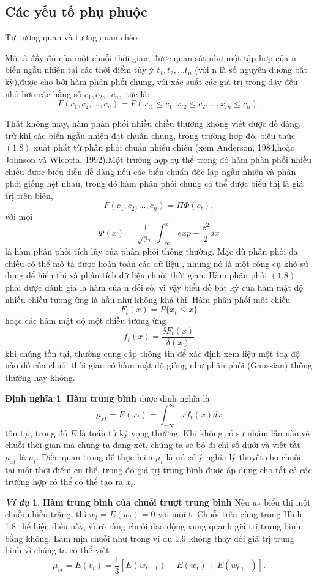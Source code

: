 \documentclass[12pt, a4paper,oneside]{book}
\theoremstyle{definition}
\newtheorem{dn}[theo]{Định nghĩa}
\newtheorem{vd}[theo]{\it Ví dụ}
\begin{document}
\subsection{Các yếu tố phụ phuộc}
Tự tương quan và tương quan chéo

Mô tả đầy đủ của một chuỗi thời gian, được quan sát như một tập hợp của n biến ngẫu nhiên tại các thời điểm tùy ý $t_{1},t_{2},...t_{n}$ (với n là số nguyên dương bất kỳ),được cho bởi hàm phân phối chung, với xác suất các giá trị trong dãy đều nhỏ hơn các hằng số $c_{1},c_{2},..c_{n},$ tức là:
$$F(c_{1},c_{2},...,c_{n})= P(x_{t1}\leq c_{1},x_{t2}\leq c_{2},...,x_{tn}\leq c_{n}).$$ 

Thật không may, hàm phân phối nhiều chiều thường không viết được dễ dàng, trừ khi các biến ngẫu nhiên đạt chuẩn chung, trong trường hợp đó, biểu thức $(1.8)$ xuất phát từ phân phối chuẩn nhiều chiều (xem Anderson, 1984,hoặc Johnson và Wicotta, 1992).Một trường hợp cụ thể trong đó hàm phân phối nhiều chiều được biểu diễn dễ dàng nếu các biến chuẩn độc lập ngẫu nhiên và phân phối giống hệt nhau, trong đó hàm phân phối chung có thể được biểu thị là giá trị trên biên,
$$F(c_{1},c_{2},...,c_{n})= \Pi \Phi(c_{t}),$$
với mọi $$\Phi(x) = \dfrac{1}{\sqrt{2\pi}} \int_{-\infty}^{x} exp -\dfrac{z^2}{2} dx $$
là hàm phân phối tích lũy của  phân phối thông thường.
Mặc dù phân phối đa chiều có thể mô tả được hoàn toàn các dữ liệu , nhưng nó là một công cụ khó sử dụng để hiển thị và phân tích dữ liệu chuỗi thời gian. Hàm phân phối $(1.8)$ phải được đánh giá là hàm của n đối số, vì vậy biểu đồ bất kỳ của hàm mật độ nhiều chiều tương ứng là hầu như không khả thi. Hàm phân phối một chiều
$${F}_{t}(x)= {P}\{x_{t}\leq x\}$$
hoặc các hàm mật độ một chiều tương ứng
$${f}_{t}(x)= \dfrac{\delta{F}_{t}(x)}{\delta(x)}$$
khi chúng tồn tại, thường cung cấp thông tin để xác định xem liệu một toạ độ nào đó của chuỗi thời gian có hàm mật độ  giống như phân phối (Gaussian) thông thường hay không.
\begin{dn}\textbf{Hàm trung bình} được định nghĩa là
	$$ \mu_{xt} = E(x_{t}) =  \int_{-\infty}^{\infty} xf_{t}(x)  dx $$
	tồn tại, trong đó $E$ là toán tử kỳ vọng thường. Khi không có sự nhầm lẫn nào về chuỗi thời gian mà chúng ta đang xét, chúng ta sẽ bỏ đi chỉ số dưới và viết tắt $\mu_{xt}$ là $\mu_{t}$.
	Điều quan trọng để thực hiện $\mu_{t}$ là nó có ý nghĩa lý thuyết cho chuỗi tại một thời điểm cụ thể, trong đó giá trị trung bình được áp dụng cho tất cả các trường hợp có thể có thể tạo ra $x_{t}$.
\end{dn}
\begin{vd}\textbf{Hàm trung bình của chuỗi trượt trung bình}
	Nếu $w_{t}$ biểu thị một chuỗi nhiễu trắng, thì $w_{t} = E (w_{t}) = 0$ với mọi t. Chuỗi trên cùng trong Hình 1.8 thể hiện điều này, vì rõ ràng chuỗi dao động xung quanh giá trị trung bình bằng không. Làm mịn chuỗi như trong ví dụ 1.9 không thay đổi giá trị trung bình vì chúng ta có thể viết
	$$\mu_{vt}= E(v_{t})=\dfrac{1}{3}[E(w_{t-1})+ E(w_{t})+ E(w_{t+1})].$$
\end{vd}
\end{document}
